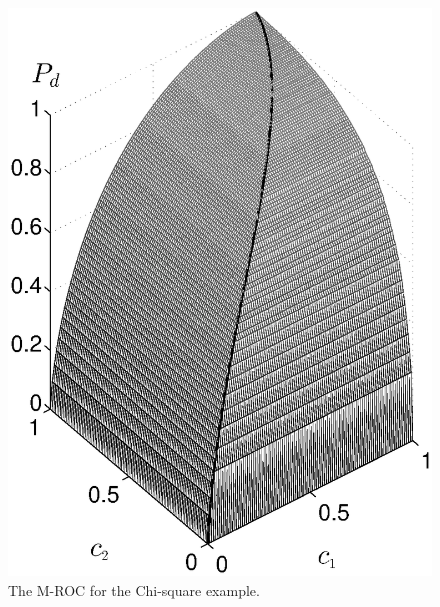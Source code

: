 \documentclass[12pt,journal,a4paper,twoside,doublecolumn]{IEEEtran}
\begin{document}
\begin{spacing}{1.0}
\begin{figure}[!t]
\centering
\includegraphics[width=12cm]{simu_chi2ROC.eps}
\caption{The M-ROC for the Chi-square example.}
\label{pic: LJS for chisquare}
\end{figure}



\end{spacing}
\end{document}
